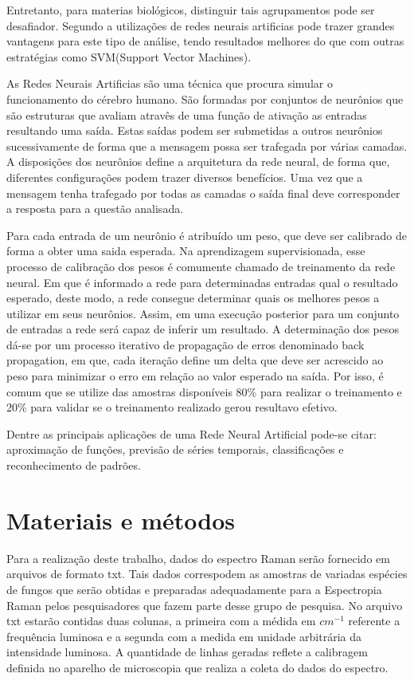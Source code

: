 \documentclass[conference,peerreview]{IEEEtran}
\begin{document}
Entretanto, para materias biológicos, distinguir tais agrupamentos pode ser desafiador. Segundo \cite{Seifert2016} a utilizações de redes neurais artificias pode trazer grandes vantagens para este tipo de análise, tendo resultados melhores do que com outras estratégias como SVM(Support Vector Machines).

As Redes Neurais Artificias são uma técnica que procura simular o funcionamento do cérebro humano. São formadas por conjuntos de neurônios que são estruturas que avaliam atravês de uma função de ativação as entradas resultando uma saída. Estas saídas podem ser submetidas a outros neurônios sucessivamente de forma que a mensagem possa ser trafegada por várias camadas. A disposições dos neurônios define a arquitetura da rede neural, de forma que, diferentes configurações podem trazer diversos benefícios. Uma vez que a mensagem tenha trafegado por todas as camadas o saída final deve corresponder a resposta para a questão analisada.

Para cada entrada de um neurônio é atribuído um peso, que deve ser calibrado de forma a obter uma saida esperada. Na aprendizagem supervisionada, esse processo de calibração dos pesos é comumente chamado de treinamento da rede neural. Em que é informado a rede para determinadas entradas qual o resultado esperado, deste modo, a rede consegue determinar quais os melhores pesos a utilizar em seus neurônios. Assim, em uma execução posterior para um conjunto de entradas a rede será capaz de inferir um resultado. A determinação dos pesos dá-se por um processo iterativo de propagação de erros denominado back propagation, em que, cada iteração define um delta que deve ser acrescido ao peso para minimizar o erro em relação ao valor esperado na saída. Por isso, é comum que se utilize das amostras disponíveis 80\% para realizar o treinamento e 20\% para validar se o treinamento realizado gerou resultavo efetivo. 

Dentre as principais aplicações de uma Rede Neural Artificial pode-se citar: aproximação de funções, previsão de séries temporais, classificações e reconhecimento de padrões.

\section{Materiais e métodos}

Para a realização deste trabalho, dados do espectro Raman serão fornecido em arquivos de formato txt. Tais dados correspodem as amostras de variadas espécies de fungos que serão obtidas e preparadas adequadamente para a Espectropia Raman pelos pesquisadores que fazem parte desse grupo de pesquisa. No arquivo txt estarão contidas duas colunas, a primeira com a médida em $cm^{-1}$ referente a frequência luminosa e a segunda com a medida em unidade arbitrária da intensidade luminosa. A quantidade de linhas geradas reflete a calibragem definida no aparelho de microscopia que realiza a coleta do dados do espectro.
\end{document}
